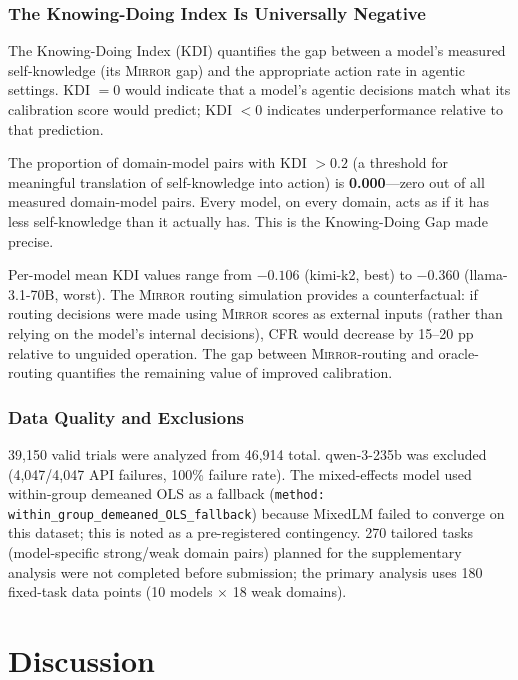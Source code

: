 \documentclass[10pt]{article}
\newcommand{\mirror}{\textsc{Mirror}}
\newcommand{\KDI}{KDI}
\newcommand{\CFR}{CFR}
\begin{document}
\subsubsection{The Knowing-Doing Index Is Universally Negative}

The Knowing-Doing Index (\KDI) quantifies the gap between a model's measured
self-knowledge (its \mirror{} gap) and the appropriate action rate in agentic settings.
\KDI{} $= 0$ would indicate that a model's agentic decisions match what its calibration
score would predict; \KDI{} $< 0$ indicates underperformance relative to that prediction.

The proportion of domain-model pairs with \KDI{} $> 0.2$ (a threshold for meaningful
translation of self-knowledge into action) is \textbf{0.000}---zero out of all measured
domain-model pairs. Every model, on every domain, acts as if it has less self-knowledge
than it actually has. This is the Knowing-Doing Gap made precise.

Per-model mean \KDI{} values range from $-0.106$ (kimi-k2, best) to $-0.360$
(llama-3.1-70B, worst). The \mirror{} routing simulation provides a counterfactual:
if routing decisions were made using \mirror{} scores as external inputs (rather than
relying on the model's internal decisions), \CFR{} would decrease by 15--20 pp
relative to unguided operation. The gap between \mirror{}-routing and oracle-routing
quantifies the remaining value of improved calibration.

\subsubsection{Data Quality and Exclusions}

39,150 valid trials were analyzed from 46,914 total. qwen-3-235b was excluded (4,047/4,047
API failures, 100\% failure rate). The mixed-effects model used within-group demeaned
OLS as a fallback (\texttt{method: within\_group\_demeaned\_OLS\_fallback}) because
MixedLM failed to converge on this dataset; this is noted as a pre-registered contingency.
270 tailored tasks (model-specific strong/weak domain pairs) planned for the supplementary
analysis were not completed before submission; the primary analysis uses 180 fixed-task
data points (10 models $\times$ 18 weak domains).

\section{Discussion}
\label{sec:discussion}
\end{document}
